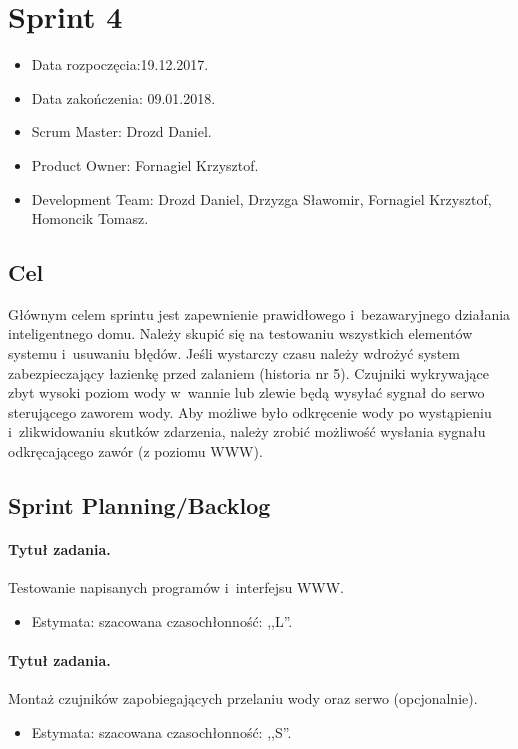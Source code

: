 \section{Sprint 4}
\begin{itemize}
	\item Data rozpoczęcia:19.12.2017.
	\item Data zakończenia: 09.01.2018.
	\item Scrum Master: Drozd Daniel.
	\item Product Owner: Fornagiel Krzysztof.
	\item Development Team: Drozd Daniel, Drzyzga Sławomir, Fornagiel Krzysztof, Homoncik Tomasz.
\end{itemize}
\subsection{Cel} 

Głównym celem sprintu jest zapewnienie prawidłowego i~bezawaryjnego działania inteligentnego domu. Należy skupić się na testowaniu wszystkich elementów systemu i~usuwaniu błędów. Jeśli wystarczy czasu należy wdrożyć system zabezpieczający łazienkę przed zalaniem (historia nr 5). Czujniki wykrywające zbyt wysoki poziom wody w~wannie lub zlewie będą wysyłać sygnał do serwo sterującego zaworem wody. Aby możliwe było odkręcenie wody po wystąpieniu i~zlikwidowaniu skutków zdarzenia, należy zrobić możliwość wysłania sygnału odkręcającego zawór (z poziomu WWW).


\subsection{Sprint Planning/Backlog}

\paragraph{Tytuł zadania.} Testowanie napisanych programów i~interfejsu WWW.
\begin{itemize}
	\item Estymata: szacowana czasochłonność: ,,L''.
\end{itemize}

\paragraph{Tytuł zadania.} Montaż czujników zapobiegających przelaniu wody oraz serwo (opcjonalnie).
\begin{itemize}
	\item Estymata: szacowana czasochłonność: ,,S''.
\end{itemize}

